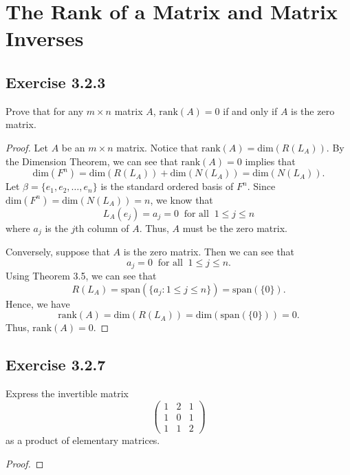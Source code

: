 \section{The Rank of a Matrix and Matrix Inverses}

\subsection*{Exercise 3.2.3} Prove that for any \( m \times n  \) matrix \( A  \), \( \text{rank}(A) = 0  \) if and only if \( A  \) is the zero matrix.
\begin{proof}
Let \( A  \) be an \( m \times n  \) matrix. Notice that \( \text{rank}(A) =  \text{dim}(R({L}_{A})) \). By the Dimension Theorem, we can see that \( \text{rank}(A) = 0  \) implies that
\[  \text{dim}(F^{n}) = \text{dim}(R({L}_{A})) + \text{dim}(N({L}_{A})) = \text{dim}(N({L}_{A})).  \]
Let \( \beta = \{ {e}_{1}, {e}_{2}, \dots, {e}_{n} \}  \) is the standard ordered basis of \( F^{n} \). Since \( \text{dim}(F^{n}) = \text{dim}(N({L}_{A})) = n \), we know that 
\[  {L}_{A}({e}_{j}) = {a}_{j} = 0 \ \text{ for all } \ 1 \leq j \leq n  \]
where \( {a}_{j} \) is the \( j \)th column of \( A  \). Thus, \( A  \) must be the zero matrix.

Conversely, suppose that \( A  \) is the zero matrix. Then we can see that 
\[   {a}_{j} = 0 \ \text{ for all } \ 1 \leq j \leq n.  \]
Using Theorem 3.5, we can see that
\[  R({L}_{A}) = \text{span}(\{ {a}_{j} : 1 \leq j \leq n  \} ) = \text{span}(\{ 0 \} ). \] 
Hence, we have
\[  \text{rank}(A) = \text{dim}(R({L}_{A})) = \text{dim}(\text{span}(\{ 0 \} )) = 0. \]
Thus, \( \text{rank}(A) = 0  \).
\end{proof}

\subsection*{Exercise 3.2.7} Express the invertible matrix 
\[ 
    \begin{pmatrix}
        1 & 2 & 1 \\
        1 & 0 & 1 \\
        1 & 1 & 2
    \end{pmatrix}
\]
as a product of elementary matrices.
\begin{proof}

\end{proof}

